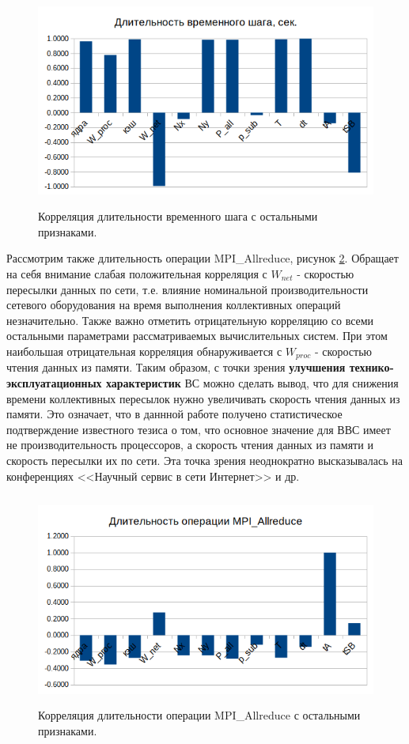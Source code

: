             
\begin{figure}[htb]
	\begin{center}
		\includegraphics[height=7cm,keepaspectratio]{images/corr_dt.png}
	\end{center}
	\caption{Корреляция длительности временного шага с остальными признаками.}
	\label{corr_dt}
\end{figure}

        Рассмотрим также длительность операции MPI\_Allreduce, рисунок \ref{corr_ta}. Обращает на себя внимание слабая положительная корреляция с $W_{net}$ - скоростью пересылки данных по сети, т.е. влияние номинальной производительности сетевого оборудования на время выполнения коллективных операций незначительно. Также важно отметить отрицательную корреляцию со всеми остальными параметрами рассматриваемых вычислительных систем. При этом наибольшая отрицательная корреляция обнаруживается с $W_{proc}$ - скоростью чтения данных из памяти. Таким образом, с точки зрения \textbf{улучшения технико-эксплуатационных характеристик} ВС можно сделать вывод, что для снижения времени коллективных пересылок нужно увеличивать скорость чтения данных из памяти. Это означает, что в даннной работе получено статистическое подтверждение известного тезиса о том, что основное значение для ВВС имеет не производительность процессоров, а скорость чтения данных из памяти и скорость пересылки их по сети. Эта точка зрения неоднократно высказывалась на конференциях <<Научный сервис в сети Интернет>> и др.      
        
\begin{figure}[htb]
	\begin{center}
		\includegraphics[height=7cm,keepaspectratio]{images/corr_Ta.png}
	\end{center}
	\caption{Корреляция длительности операции MPI\_Allreduce с остальными признаками.}
	\label{corr_ta}
\end{figure}

